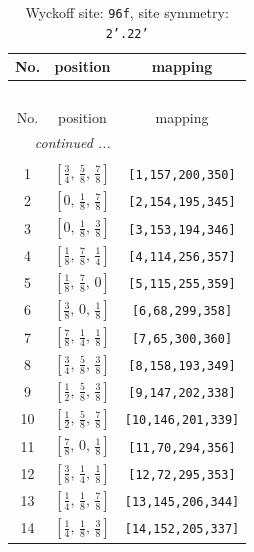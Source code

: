 \documentclass[fleqn,8pt]{jsarticle}
\begin{document}
\begin{longtable}{ccc}
\caption{Wyckoff site: {\tt 96f}, site symmetry: {\tt 2'.22'}}
 \\
 \hline \hline
No. & position & mapping \\ \hline \endfirsthead

\multicolumn{2}{l}{\tablename\ \thetable{}} \\
 \hline \hline
No. & position & mapping \\ \hline \endhead

 \hline \hline
\multicolumn{2}{r}{\footnotesize\it continued ...} \\ \endfoot

 \hline \hline
\multicolumn{2}{r}{} \\ \endlastfoot

1 & $\left[ \frac{3}{4},\, \frac{5}{8},\, \frac{7}{8} \right]$ & {\tt [1,157,200,350]} \\ \hline
2 & $\left[ 0,\, \frac{1}{8},\, \frac{7}{8} \right]$ & {\tt [2,154,195,345]} \\ \hline
3 & $\left[ 0,\, \frac{1}{8},\, \frac{3}{8} \right]$ & {\tt [3,153,194,346]} \\ \hline
4 & $\left[ \frac{1}{8},\, \frac{7}{8},\, \frac{1}{4} \right]$ & {\tt [4,114,256,357]} \\ \hline
5 & $\left[ \frac{1}{8},\, \frac{7}{8},\, 0 \right]$ & {\tt [5,115,255,359]} \\ \hline
6 & $\left[ \frac{3}{8},\, 0,\, \frac{1}{8} \right]$ & {\tt [6,68,299,358]} \\ \hline
7 & $\left[ \frac{7}{8},\, \frac{1}{4},\, \frac{1}{8} \right]$ & {\tt [7,65,300,360]} \\ \hline
8 & $\left[ \frac{3}{4},\, \frac{5}{8},\, \frac{3}{8} \right]$ & {\tt [8,158,193,349]} \\ \hline
9 & $\left[ \frac{1}{2},\, \frac{5}{8},\, \frac{3}{8} \right]$ & {\tt [9,147,202,338]} \\ \hline
10 & $\left[ \frac{1}{2},\, \frac{5}{8},\, \frac{7}{8} \right]$ & {\tt [10,146,201,339]} \\ \hline
11 & $\left[ \frac{7}{8},\, 0,\, \frac{1}{8} \right]$ & {\tt [11,70,294,356]} \\ \hline
12 & $\left[ \frac{3}{8},\, \frac{1}{4},\, \frac{1}{8} \right]$ & {\tt [12,72,295,353]} \\ \hline
13 & $\left[ \frac{1}{4},\, \frac{1}{8},\, \frac{7}{8} \right]$ & {\tt [13,145,206,344]} \\ \hline
14 & $\left[ \frac{1}{4},\, \frac{1}{8},\, \frac{3}{8} \right]$ & {\tt [14,152,205,337]} \\ \hline

\end{longtable}
\end{document}
